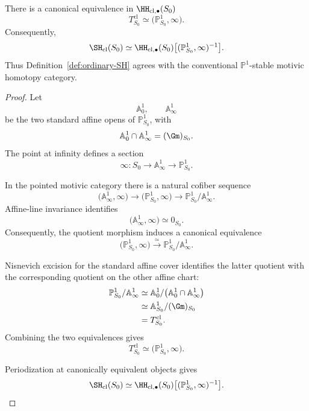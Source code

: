 \begin{proposition}
\label{prop:ordinary-T-P1-comparison}
There is a canonical equivalence in
\(\HH_{\mathrm{cl},\bullet}(S_0)\)
\[
    T^{\mathrm{cl}}_{S_0}
    \simeq
    \bigl(
      \mathbb P^1_{S_0},
      \infty
    \bigr).
\]
Consequently,
\[
    \SH_{\mathrm{cl}}(S_0)
    \simeq
    \HH_{\mathrm{cl},\bullet}(S_0)
    \bigl[
      (\mathbb P^1_{S_0},\infty)^{-1}
    \bigr].
\]
Thus Definition~\ref{def:ordinary-SH} agrees with the conventional
\(\mathbb P^1\)-stable motivic homotopy category.
\end{proposition}

\begin{proof}
Let
\[
    \mathbb A^1_0,
    \qquad
    \mathbb A^1_\infty
\]
be the two standard affine opens of
\(\mathbb P^1_{S_0}\), with
\[
    \mathbb A^1_0\cap\mathbb A^1_\infty
    =
    (\Gm)_{S_0}.
\]
The point at infinity defines a section
\[
    \infty:
    S_0\longrightarrow\mathbb A^1_\infty
    \longrightarrow\mathbb P^1_{S_0}.
\]

In the pointed motivic category there is a natural cofiber sequence
\[
    \bigl(
      \mathbb A^1_\infty,\infty
    \bigr)
    \longrightarrow
    \bigl(
      \mathbb P^1_{S_0},\infty
    \bigr)
    \longrightarrow
    \mathbb P^1_{S_0}/\mathbb A^1_\infty.
\]
Affine-line invariance identifies
\[
    \bigl(
      \mathbb A^1_\infty,\infty
    \bigr)
    \simeq
    0_{S_0}.
\]
Consequently, the quotient morphism induces a canonical equivalence
\[
    \bigl(
      \mathbb P^1_{S_0},\infty
    \bigr)
    \xrightarrow{\simeq}
    \mathbb P^1_{S_0}/\mathbb A^1_\infty.
\]

Nisnevich excision for the standard affine cover identifies the latter
quotient with the corresponding quotient on the other affine chart:
\[
\begin{aligned}
    \mathbb P^1_{S_0}/\mathbb A^1_\infty
    &\simeq
    \mathbb A^1_0/
    \bigl(
      \mathbb A^1_0\cap\mathbb A^1_\infty
    \bigr) \\
    &\simeq
    \mathbb A^1_{S_0}/(\Gm)_{S_0} \\
    &=
    T^{\mathrm{cl}}_{S_0}.
\end{aligned}
\]
Combining the two equivalences gives
\[
    T^{\mathrm{cl}}_{S_0}
    \simeq
    \bigl(
      \mathbb P^1_{S_0},\infty
    \bigr).
\]

Periodization at canonically equivalent objects gives
\[
    \SH_{\mathrm{cl}}(S_0)
    \simeq
    \HH_{\mathrm{cl},\bullet}(S_0)
    \bigl[
      (\mathbb P^1_{S_0},\infty)^{-1}
    \bigr].
\]
\end{proof}


